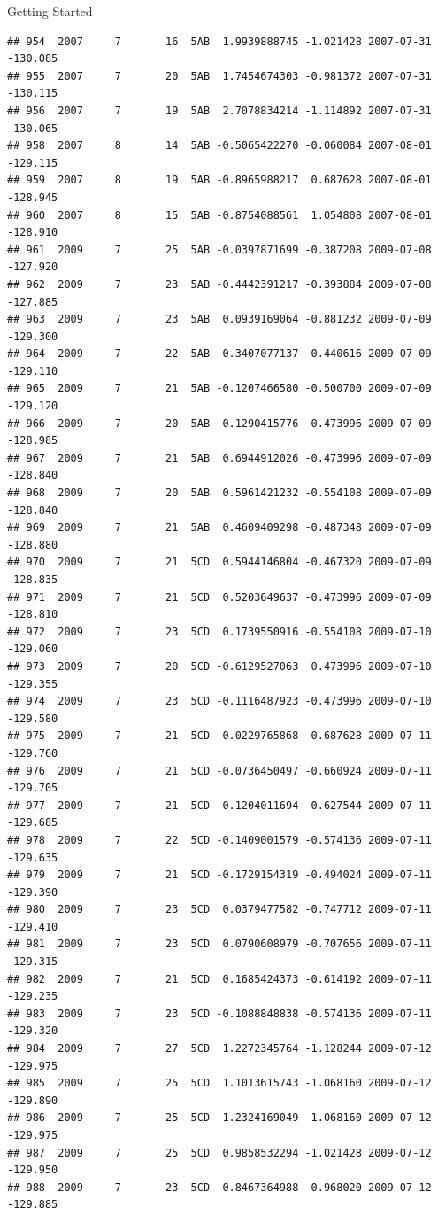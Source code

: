 \documentclass[
  ignorenonframetext,
]{beamer}
\begin{document}
\begin{frame}[fragile]{Getting Started}
\begin{verbatim}
## 954  2007     7       16  5AB  1.9939888745 -1.021428 2007-07-31 -130.085
## 955  2007     7       20  5AB  1.7454674303 -0.981372 2007-07-31 -130.115
## 956  2007     7       19  5AB  2.7078834214 -1.114892 2007-07-31 -130.065
## 958  2007     8       14  5AB -0.5065422270 -0.060084 2007-08-01 -129.115
## 959  2007     8       19  5AB -0.8965988217  0.687628 2007-08-01 -128.945
## 960  2007     8       15  5AB -0.8754088561  1.054808 2007-08-01 -128.910
## 961  2009     7       25  5AB -0.0397871699 -0.387208 2009-07-08 -127.920
## 962  2009     7       23  5AB -0.4442391217 -0.393884 2009-07-08 -127.885
## 963  2009     7       23  5AB  0.0939169064 -0.881232 2009-07-09 -129.300
## 964  2009     7       22  5AB -0.3407077137 -0.440616 2009-07-09 -129.110
## 965  2009     7       21  5AB -0.1207466580 -0.500700 2009-07-09 -129.120
## 966  2009     7       20  5AB  0.1290415776 -0.473996 2009-07-09 -128.985
## 967  2009     7       21  5AB  0.6944912026 -0.473996 2009-07-09 -128.840
## 968  2009     7       20  5AB  0.5961421232 -0.554108 2009-07-09 -128.840
## 969  2009     7       21  5AB  0.4609409298 -0.487348 2009-07-09 -128.880
## 970  2009     7       21  5CD  0.5944146804 -0.467320 2009-07-09 -128.835
## 971  2009     7       21  5CD  0.5203649637 -0.473996 2009-07-09 -128.810
## 972  2009     7       23  5CD  0.1739550916 -0.554108 2009-07-10 -129.060
## 973  2009     7       20  5CD -0.6129527063  0.473996 2009-07-10 -129.355
## 974  2009     7       23  5CD -0.1116487923 -0.473996 2009-07-10 -129.580
## 975  2009     7       21  5CD  0.0229765868 -0.687628 2009-07-11 -129.760
## 976  2009     7       21  5CD -0.0736450497 -0.660924 2009-07-11 -129.705
## 977  2009     7       21  5CD -0.1204011694 -0.627544 2009-07-11 -129.685
## 978  2009     7       22  5CD -0.1409001579 -0.574136 2009-07-11 -129.635
## 979  2009     7       21  5CD -0.1729154319 -0.494024 2009-07-11 -129.390
## 980  2009     7       23  5CD  0.0379477582 -0.747712 2009-07-11 -129.410
## 981  2009     7       23  5CD  0.0790608979 -0.707656 2009-07-11 -129.315
## 982  2009     7       21  5CD  0.1685424373 -0.614192 2009-07-11 -129.235
## 983  2009     7       23  5CD -0.1088848838 -0.574136 2009-07-11 -129.320
## 984  2009     7       27  5CD  1.2272345764 -1.128244 2009-07-12 -129.975
## 985  2009     7       25  5CD  1.1013615743 -1.068160 2009-07-12 -129.890
## 986  2009     7       25  5CD  1.2324169049 -1.068160 2009-07-12 -129.975
## 987  2009     7       25  5CD  0.9858532294 -1.021428 2009-07-12 -129.950
## 988  2009     7       23  5CD  0.8467364988 -0.968020 2009-07-12 -129.885

\end{verbatim}
\end{frame}
\end{document}
